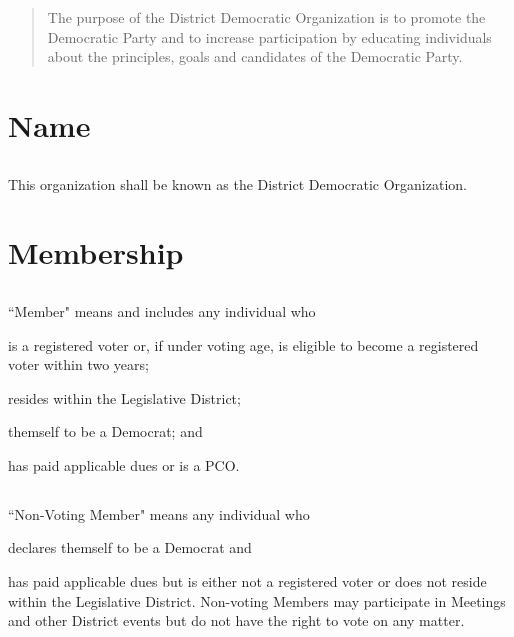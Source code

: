 \begin{abstract}
The purpose of the \fortythird{} District Democratic Organization is to promote the Democratic Party and to increase participation by educating individuals about the principles, goals and candidates of the Democratic Party.
\end{abstract}

\section{Name}
\subsection{}
This organization shall be known as the \fortythird{} District Democratic Organization.

\section{Membership}
\subsection{} \label{member}
``Member" means and includes any individual who
\begin{inlinealphalist}
    \item is a registered voter or, if under voting age, is eligible to become a registered voter within two years;
    \item resides within the \fortythird{} Legislative District;
    \item themself to be a Democrat; and
    \item has paid applicable dues or is a PCO.
\end{inlinealphalist}

\subsection{} \label{non-voting-member}
``Non-Voting Member" means any individual who
\begin{inlinealphalist}
    \item declares themself to be a Democrat and
    \item has paid applicable dues but is either not a registered voter or does not reside within the \fortythird{} Legislative District. Non-voting Members may participate in Meetings and other \fortythird{} District events but do not have the right to vote on any matter.
\end{inlinealphalist}

